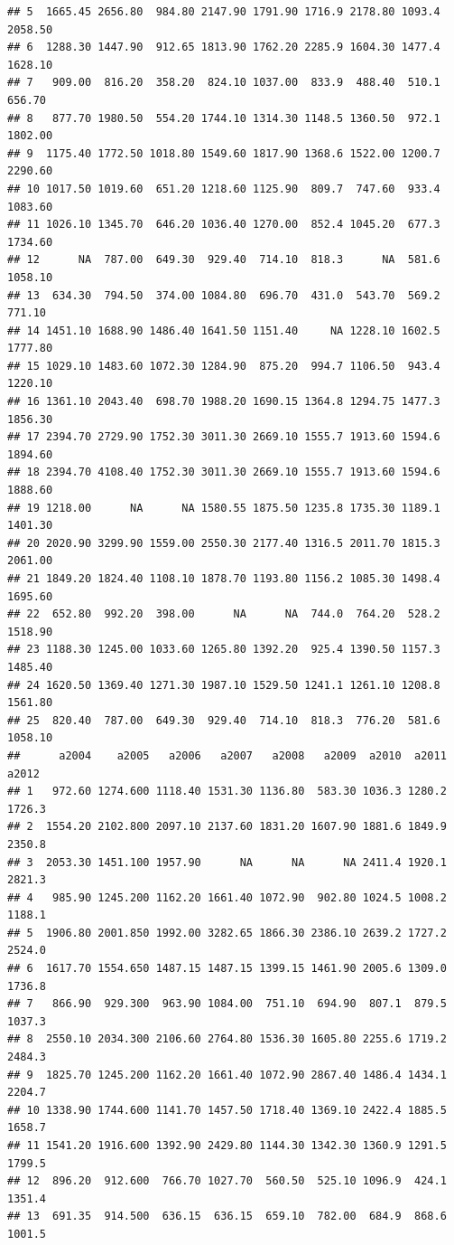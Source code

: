 \documentclass[11pt,]{article}
\begin{document}
\begin{verbatim}
## 5  1665.45 2656.80  984.80 2147.90 1791.90 1716.9 2178.80 1093.4 2058.50
## 6  1288.30 1447.90  912.65 1813.90 1762.20 2285.9 1604.30 1477.4 1628.10
## 7   909.00  816.20  358.20  824.10 1037.00  833.9  488.40  510.1  656.70
## 8   877.70 1980.50  554.20 1744.10 1314.30 1148.5 1360.50  972.1 1802.00
## 9  1175.40 1772.50 1018.80 1549.60 1817.90 1368.6 1522.00 1200.7 2290.60
## 10 1017.50 1019.60  651.20 1218.60 1125.90  809.7  747.60  933.4 1083.60
## 11 1026.10 1345.70  646.20 1036.40 1270.00  852.4 1045.20  677.3 1734.60
## 12      NA  787.00  649.30  929.40  714.10  818.3      NA  581.6 1058.10
## 13  634.30  794.50  374.00 1084.80  696.70  431.0  543.70  569.2  771.10
## 14 1451.10 1688.90 1486.40 1641.50 1151.40     NA 1228.10 1602.5 1777.80
## 15 1029.10 1483.60 1072.30 1284.90  875.20  994.7 1106.50  943.4 1220.10
## 16 1361.10 2043.40  698.70 1988.20 1690.15 1364.8 1294.75 1477.3 1856.30
## 17 2394.70 2729.90 1752.30 3011.30 2669.10 1555.7 1913.60 1594.6 1894.60
## 18 2394.70 4108.40 1752.30 3011.30 2669.10 1555.7 1913.60 1594.6 1888.60
## 19 1218.00      NA      NA 1580.55 1875.50 1235.8 1735.30 1189.1 1401.30
## 20 2020.90 3299.90 1559.00 2550.30 2177.40 1316.5 2011.70 1815.3 2061.00
## 21 1849.20 1824.40 1108.10 1878.70 1193.80 1156.2 1085.30 1498.4 1695.60
## 22  652.80  992.20  398.00      NA      NA  744.0  764.20  528.2 1518.90
## 23 1188.30 1245.00 1033.60 1265.80 1392.20  925.4 1390.50 1157.3 1485.40
## 24 1620.50 1369.40 1271.30 1987.10 1529.50 1241.1 1261.10 1208.8 1561.80
## 25  820.40  787.00  649.30  929.40  714.10  818.3  776.20  581.6 1058.10
##      a2004    a2005   a2006   a2007   a2008   a2009  a2010  a2011  a2012
## 1   972.60 1274.600 1118.40 1531.30 1136.80  583.30 1036.3 1280.2 1726.3
## 2  1554.20 2102.800 2097.10 2137.60 1831.20 1607.90 1881.6 1849.9 2350.8
## 3  2053.30 1451.100 1957.90      NA      NA      NA 2411.4 1920.1 2821.3
## 4   985.90 1245.200 1162.20 1661.40 1072.90  902.80 1024.5 1008.2 1188.1
## 5  1906.80 2001.850 1992.00 3282.65 1866.30 2386.10 2639.2 1727.2 2524.0
## 6  1617.70 1554.650 1487.15 1487.15 1399.15 1461.90 2005.6 1309.0 1736.8
## 7   866.90  929.300  963.90 1084.00  751.10  694.90  807.1  879.5 1037.3
## 8  2550.10 2034.300 2106.60 2764.80 1536.30 1605.80 2255.6 1719.2 2484.3
## 9  1825.70 1245.200 1162.20 1661.40 1072.90 2867.40 1486.4 1434.1 2204.7
## 10 1338.90 1744.600 1141.70 1457.50 1718.40 1369.10 2422.4 1885.5 1658.7
## 11 1541.20 1916.600 1392.90 2429.80 1144.30 1342.30 1360.9 1291.5 1799.5
## 12  896.20  912.600  766.70 1027.70  560.50  525.10 1096.9  424.1 1351.4
## 13  691.35  914.500  636.15  636.15  659.10  782.00  684.9  868.6 1001.5

\end{verbatim}
\end{document}
